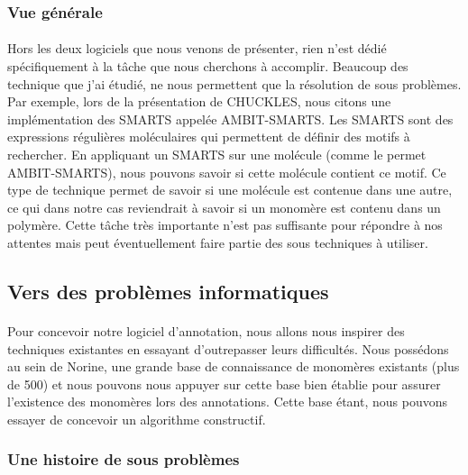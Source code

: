 \documentclass[12pt,french,twoside]{report}
\begin{document}
\subsubsection{Vue générale}

\paragraph{}Hors les deux logiciels que nous venons de présenter, rien n'est dédié spécifiquement à la tâche que nous cherchons à accomplir.
Beaucoup des technique que j'ai étudié, ne nous permettent que la résolution de sous problèmes.
Par exemple, lors de la présentation de CHUCKLES, nous citons une implémentation des SMARTS appelée AMBIT-SMARTS.
Les SMARTS sont des expressions régulières moléculaires qui permettent de définir des motifs à rechercher.
En appliquant un SMARTS sur une molécule (comme le permet AMBIT-SMARTS), nous pouvons savoir si cette molécule contient ce motif.
Ce type de technique permet de savoir si une molécule est contenue dans une autre, ce qui dans notre cas reviendrait à savoir si un monomère est contenu dans un polymère.
Cette tâche très importante n'est pas suffisante pour répondre à nos attentes mais peut éventuellement faire partie des sous techniques à utiliser.




\subsection{Vers des problèmes informatiques}

\paragraph{}Pour concevoir notre logiciel d'annotation, nous allons nous inspirer des techniques existantes en essayant d'outrepasser leurs difficultés.
Nous possédons au sein de Norine, une grande base de connaissance de monomères existants (plus de 500) et nous pouvons nous appuyer sur cette base bien établie pour assurer l'existence des monomères lors des annotations.
Cette base étant, nous pouvons essayer de concevoir un algorithme constructif.


\subsubsection{Une histoire de sous problèmes}
\end{document}
